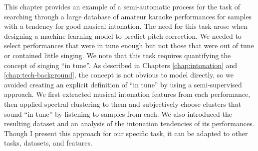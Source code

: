 This chapter provides an example of a semi-automatic process for the task of searching through a large database of amateur karaoke performances for samples with a tendency for good musical intonation. The need for this task arose when designing a machine-learning model to predict pitch correction. We needed to select performances that were in tune enough but not those that were out of tune or contained little singing. We note that this task requires quantifying the concept of singing ``in tune''. As described in Chapters \ref{chap:intonation} and \ref{chap:tech-background}, the concept is not obvious to model directly, so we avoided creating an explicit definition of ``in tune'' by using a semi-supervised approach. We first extracted musical intonation features from each performance, then applied spectral clustering to them and subjectively choose clusters that sound ``in tune'' by listening to samples from each. We also introduced the resulting dataset and an analysis of the intonation tendencies of its performances. Though I present this approach for our specific task, it can be adapted to other tasks, datasets, and features.

